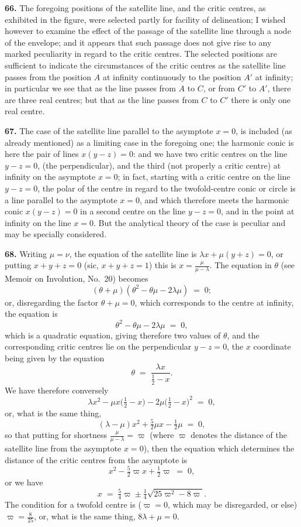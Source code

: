 \documentclass[11pt,a4paper]{article}
\begin{document}
\medskip

\textbf{66.} The foregoing positions of the satellite line, and the critic centres, as exhibited in the figure, were selected partly for facility of delineation; I wished however to examine the effect of the passage of the satellite line through a node of the envelope; and it appears that such passage does not give rise to any marked peculiarity in regard to the critic centres. The selected positions are sufficient to indicate the circumstances of the critic centres as the satellite line passes from the position $A$ at infinity continuously to the position $A'$ at infinity; in particular we see that as the line passes from $A$ to $C$, or from $C'$ to $A'$, there are three real centres; but that as the line passes from $C$ to $C'$ there is only one real centre.

\medskip

\textbf{67.} The case of the satellite line parallel to the asymptote $x=0$, is included (as already mentioned) as a limiting case in the foregoing one; the harmonic conic is here the pair of lines $x(y-z)=0$: and we have two critic centres on the line $y-z=0$, (the perpendicular), and the third (not properly a critic centre) at infinity on the asymptote $x=0$; in fact, starting with a critic centre on the line $y-z=0$, the polar of the centre in regard to the twofold-centre conic or circle is a line parallel to the asymptote $x=0$, and which therefore meets the harmonic conic $x(y-z)=0$ in a second centre on the line $y-z=0$, and in the point at infinity on the line $x=0$. But the analytical theory of the case is peculiar and may be specially considered.

\medskip

\textbf{68.} Writing $\mu = \nu$, the equation of the satellite line is $\lambda x + \mu(y+z) = 0$, or putting $x+y+z=0$ (sic, $x+y+z=1$) this is $x = \tfrac{\mu}{\mu-\lambda}$. The equation in $\theta$ (see Memoir on Involution, No.~20) becomes
\[
(\theta+\mu)(\theta^{2}-\theta\mu-2\lambda\mu) \;=\; 0;
\]
or, disregarding the factor $\theta + \mu = 0$, which corresponds to the centre at infinity, the equation is
\[
\theta^{2}-\theta\mu-2\lambda\mu \;=\; 0,
\]
which is a quadratic equation, giving therefore two values of $\theta$, and the corresponding critic centres lie on the perpendicular $y-z=0$, the $x$ coordinate being given by the equation
\[
\theta \;=\; \frac{\lambda x}{\tfrac{1}{2}-x}.
\]
We have therefore conversely
\[
\lambda x^{2} - \mu x\bigl(\tfrac{1}{2}-x\bigr) - 2\mu\bigl(\tfrac{1}{2}-x\bigr)^{2} \;=\; 0,
\]
or, what is the same thing,
\[
(\lambda-\mu)x^{2} + \tfrac{5}{2}\mu x - \tfrac{1}{2}\mu \;=\; 0,
\]
so that putting for shortness $\tfrac{\mu}{\mu-\lambda}=\varpi$ (where $\varpi$ denotes the distance of the satellite line from the asymptote $x=0$), then the equation which determines the distance of the critic centres from the asymptote is
\[
x^{2} - \tfrac{5}{2}\varpi x + \tfrac{1}{2}\varpi \;=\; 0,
\]
or we have
\[
x \;=\; \tfrac{5}{4}\varpi \pm \tfrac{1}{4}\sqrt{25\varpi^{2}-8\varpi}.
\]
The condition for a twofold centre is ($\varpi = 0$, which may be disregarded, or else) $\varpi = \tfrac{8}{25}$, or, what is the same thing, $8\lambda + \mu = 0$.
\end{document}
